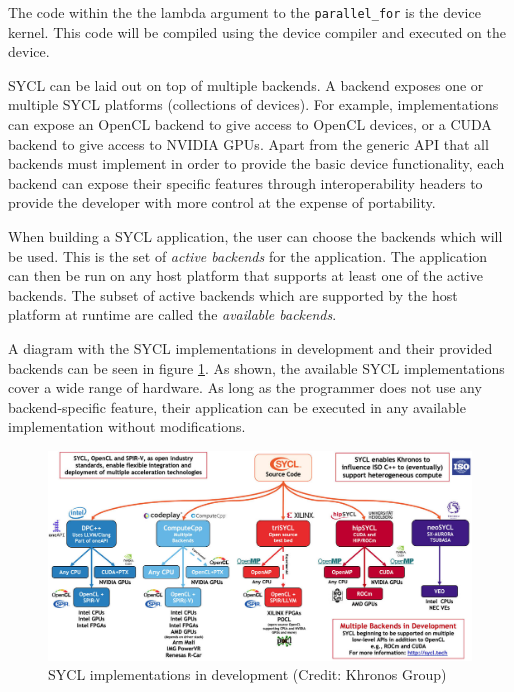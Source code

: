 The code within the the lambda argument to the \texttt{parallel\_for} is the device kernel. This code will be compiled using the device compiler and executed on the device.

SYCL can be laid out on top of multiple backends. A backend exposes one or multiple SYCL platforms (collections of devices). For example, implementations can expose an OpenCL backend to give access to OpenCL devices, or a CUDA backend to give access to NVIDIA GPUs. Apart from the generic API that all backends must implement in order to provide the basic device functionality, each backend can expose their specific features through interoperability headers to provide the developer with more control at the expense of portability.

When building a SYCL application, the user can choose the backends which will be used. This is the set of \textit{active backends} for the application. The application can then be run on any host platform that supports at least one of the active backends. The subset of active backends which are supported by the host platform at runtime are called the \textit{available backends}.

A diagram with the SYCL implementations in development and their provided backends can be seen in figure \ref{fig:sycl-implementations}. As shown, the available SYCL implementations cover a wide range of hardware. As long as the programmer does not use any backend-specific feature, their application can be executed in any available implementation without modifications.

\begin{figure}[ht]
    \centering
    \includegraphics[width=\textwidth]{img/sycl-implementations.png}
    \captionsetup{justification=centering}
    \caption{SYCL implementations in development (Credit: Khronos Group)}
    \label{fig:sycl-implementations}
\end{figure}

